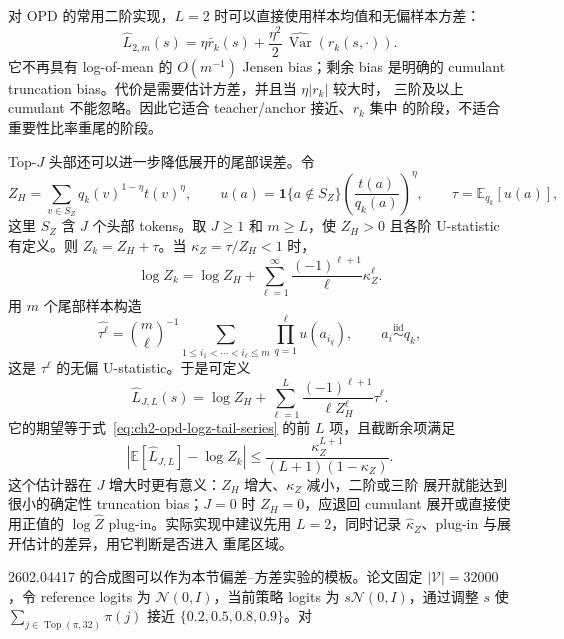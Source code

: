 \documentclass[lang=cn,scheme=chinese,openany]{../book/elegantbook}
\begin{document}
对 OPD 的常用二阶实现，$L=2$ 时可以直接使用样本均值和无偏样本方差：
\begin{equation}
\widehat L_{2,m}(s)=\eta\bar r_k(s)
 +\frac{\eta^2}{2}\,\widehat{\operatorname{Var}}(r_k(s,\cdot)).
\label{eq:ch2-opd-logz-second-estimator}
\end{equation}
它不再具有 log-of-mean 的 $O(m^{-1})$ Jensen bias；剩余 bias 是明确的 cumulant truncation bias。代价是需要估计方差，并且当 $\eta|r_k|$ 较大时， 三阶及以上 cumulant 不能忽略。因此它适合 teacher/anchor 接近、$r_k$ 集中 的阶段，不适合重要性比率重尾的阶段。

Top-$J$ 头部还可以进一步降低展开的尾部误差。令
\begin{equation}
Z_H=\sum_{v\in S_Z}q_k(v)^{1-\eta}t(v)^\eta,
\qquad
u(a)=\mathbf 1\{a\notin S_Z\}
 \left(\frac{t(a)}{q_k(a)}\right)^\eta,
\qquad \tau=\mathbb E_{q_k}[u(a)],
\end{equation}
这里 $S_Z$ 含 $J$ 个头部 tokens。取 $J\ge1$ 和 $m\ge L$，使 $Z_H>0$ 且各阶 U-statistic 有定义。则 $Z_k=Z_H+\tau$。当 $\kappa_Z=\tau/Z_H<1$ 时，
\begin{equation}
\log Z_k=\log Z_H+
\sum_{\ell=1}^{\infty}\frac{(-1)^{\ell+1}}{\ell}\kappa_Z^\ell.
\label{eq:ch2-opd-logz-tail-series}
\end{equation}
用 $m$ 个尾部样本构造
\begin{equation}
\widehat{\tau^\ell}=\binom{m}{\ell}^{-1}
\sum_{1\le i_1<\cdots<i_\ell\le m}
\prod_{q=1}^{\ell}u(a_{i_q}),
\qquad a_i\overset{\mathrm{iid}}{\sim}q_k,
\end{equation}
这是 $\tau^\ell$ 的无偏 U-statistic。于是可定义
\begin{equation}
\widehat L_{J,L}(s)=\log Z_H+
\sum_{\ell=1}^{L}\frac{(-1)^{\ell+1}}{\ell Z_H^\ell}
\widehat{\tau^\ell}.
\label{eq:ch2-opd-logz-tail-series-estimator}
\end{equation}
它的期望等于式~\eqref{eq:ch2-opd-logz-tail-series} 的前 $L$ 项，且截断余项满足
\begin{equation}
\left|\mathbb E[\widehat L_{J,L}]-\log Z_k\right|
\leq \frac{\kappa_Z^{L+1}}{(L+1)(1-\kappa_Z)}.
\label{eq:ch2-opd-logz-tail-remainder}
\end{equation}
这个估计器在 $J$ 增大时更有意义：$Z_H$ 增大、$\kappa_Z$ 减小，二阶或三阶 展开就能达到很小的确定性 truncation bias；$J=0$ 时 $Z_H=0$，应退回 cumulant 展开或直接使用正值的 $\log\widehat Z$ plug-in。实际实现中建议先用 $L=2$，同时记录 $\widehat\kappa_Z$、plug-in 与展开估计的差异，用它判断是否进入 重尾区域。

2602.04417 的合成图可以作为本节偏差--方差实验的模板。论文固定 $|\mathcal V|=32000$，令 reference logits 为 $\mathcal N(0,I)$，当前策略 logits 为 $s\mathcal N(0,I)$，通过调整 $s$ 使 $\sum_{j\in\operatorname{Top}(\pi,32)}\pi(j)$ 接近 $\{0.2,0.5,0.8,0.9\}$。对
\end{document}
